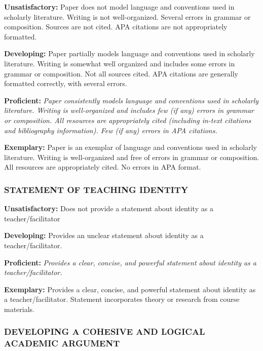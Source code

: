 \documentclass[
]{book}
\begin{document}
\textbf{Unsatisfactory:} Paper does not model language and conventions used in scholarly literature. Writing is not well-organized. Several errors in grammar or composition. Sources are not cited. APA citations are not appropriately formatted.

\textbf{Developing:} Paper partially models language and conventions used in scholarly literature. Writing is somewhat well organized and includes some errors in grammar or composition. Not all sources cited. APA citations are generally formatted correctly, with several errors.

\textbf{Proficient:} \emph{Paper consistently models language and conventions used in scholarly literature. Writing is well-organized and includes few (if any) errors in grammar or composition. All resources are appropriately cited (including in-text citations and bibliography information). Few (if any) errors in APA citations.}

\textbf{Exemplary:} Paper is an exemplar of language and conventions used in scholarly literature. Writing is well-organized and free of errors in grammar or composition. All resources are appropriately cited. No errors in APA format.

\hypertarget{statement-of-teaching-identity}{%
\subsubsection*{STATEMENT OF TEACHING IDENTITY}\label{statement-of-teaching-identity}}

\textbf{Unsatisfactory:} Does not provide a statement about identity as a teacher/facilitator

\textbf{Developing:} Provides an unclear statement about identity as a teacher/facilitator.

\textbf{Proficient:} \emph{Provides a clear, concise, and powerful statement about identity as a teacher/facilitator.}

\textbf{Exemplary:} Provides a clear, concise, and powerful statement about identity as a teacher/facilitator. Statement incorporates theory or research from course materials.

\hypertarget{developing-a-cohesive-and-logical-academic-argument}{%
\subsubsection*{DEVELOPING A COHESIVE AND LOGICAL ACADEMIC ARGUMENT}\label{developing-a-cohesive-and-logical-academic-argument}}
\end{document}
